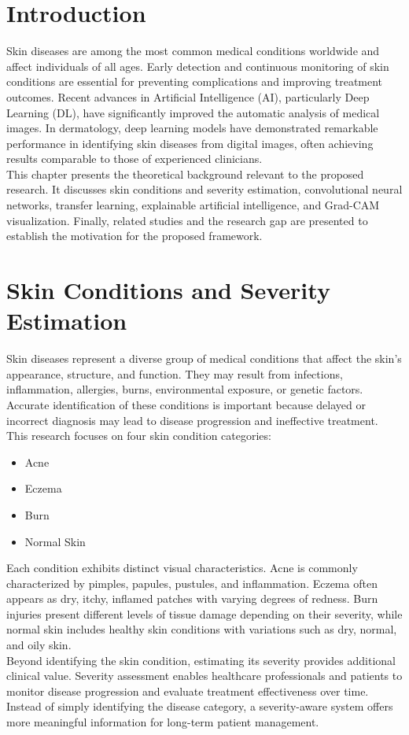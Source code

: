 \section{Introduction}
Skin diseases are among the most common medical conditions worldwide and affect individuals of all ages. Early detection and continuous monitoring of skin conditions are essential for preventing complications and improving treatment outcomes. Recent advances in Artificial Intelligence (AI), particularly Deep Learning (DL), have significantly improved the automatic analysis of medical images. In dermatology, deep learning models have demonstrated remarkable performance in identifying skin diseases from digital images, often achieving results comparable to those of experienced clinicians.\\
This chapter presents the theoretical background relevant to the proposed research. It discusses skin conditions and severity estimation, convolutional neural networks, transfer learning, explainable artificial intelligence, and Grad-CAM visualization. Finally, related studies and the research gap are presented to establish the motivation for the proposed framework.

\section{Skin Conditions and Severity Estimation}
Skin diseases represent a diverse group of medical conditions that affect the skin's appearance, structure, and function. They may result from infections, inflammation, allergies, burns, environmental exposure, or genetic factors. Accurate identification of these conditions is important because delayed or incorrect diagnosis may lead to disease progression and ineffective treatment.\\

This research focuses on four skin condition categories:
\begin{itemize}
    \item Acne
    \item Eczema
    \item Burn
    \item Normal Skin
\end{itemize}

Each condition exhibits distinct visual characteristics. Acne is commonly characterized by pimples, papules, pustules, and inflammation. Eczema often appears as dry, itchy, inflamed patches with varying degrees of redness. Burn injuries present different levels of tissue damage depending on their severity, while normal skin includes healthy skin conditions with variations such as dry, normal, and oily skin.\\
Beyond identifying the skin condition, estimating its severity provides additional clinical value. Severity assessment enables healthcare professionals and patients to monitor disease progression and evaluate treatment effectiveness over time. Instead of simply identifying the disease category, a severity-aware system offers more meaningful information for long-term patient management.

